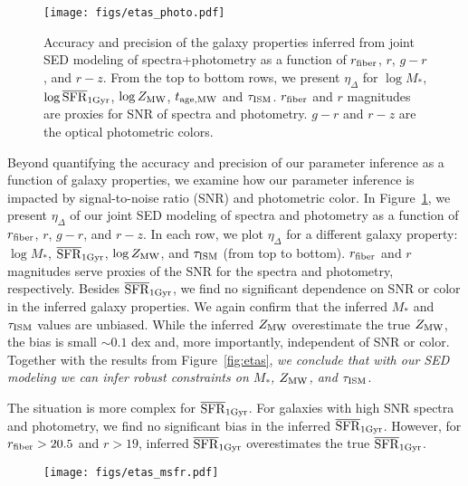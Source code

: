 \begin{figure}
\begin{center}
    \texttt{[image: figs/etas\_photo.pdf]}
    \caption{
        Accuracy and precision of the galaxy properties inferred from joint SED
        modeling of spectra+photometry as a function of $r_{\rm fiber}$, $r$,
        $g-r$, and $r-z$.
        From the top to bottom rows, we present $\eta_\Delta$ for $\log M_*$,
        $\log\overline{\rm SFR}_{\rm 1Gyr}$, $\log Z_{\rm MW}$, $t_{\rm age, MW}$ and $\tau_{\rm ISM}$.
        $r_{\rm fiber}$ and $r$ magnitudes are proxies for SNR of spectra and
        photometry. 
        $g-r$ and $r-z$ are the optical photometric colors. 
    } 
    \label{fig:systematics}
\end{center}
\end{figure}


Beyond quantifying the accuracy and precision of our parameter inference as a
function of galaxy properties, we examine how our parameter inference is
impacted by signal-to-noise ratio (SNR) and photometric color. 
In Figure~\ref{fig:systematics}, we present $\eta_\Delta$ of our joint
SED modeling of spectra and photometry as a function of $r_{\rm fiber}$, $r$,
$g-r$, and $r-z$. 
In each row, we plot $\eta_\Delta$ for a different galaxy property: $\log M_*$,
$\overline{\rm SFR}_{\rm 1Gyr}$, $\log Z_{\rm MW}$, and $\tau_{\rm ISM}$ (from top to bottom).
$r_{\rm fiber}$ and $r$ magnitudes serve proxies of the SNR for the spectra and
photometry, respectively. 
Besides $\overline{\rm SFR}_{\rm 1Gyr}$, we find no significant dependence on SNR or color in the
inferred galaxy properties. 
We again confirm that the inferred $M_*$ and $\tau_{\rm ISM}$ values are
unbiased.
While the inferred $Z_{\rm MW}$ overestimate the true $Z_{\rm MW}$, the bias is
small $\sim 0.1$ dex and, more importantly, independent of SNR or color. 
Together with the results from Figure~\ref{fig:etas}, \emph{we conclude that with our
SED modeling we can infer robust constraints on $M_*$, $Z_{\rm MW}$, and
$\tau_{\rm ISM}$}.

The situation is more complex for $\overline{\rm SFR}_{\rm 1Gyr}$. 
For galaxies with high SNR spectra and photometry, we find no significant bias
in the inferred $\overline{\rm SFR}_{\rm 1Gyr}$. 
However, for $r_{\rm fiber} > 20.5$ and $r > 19$, inferred $\overline{\rm SFR}_{\rm 1Gyr}$
overestimates the true $\overline{\rm SFR}_{\rm 1Gyr}$. 


\begin{figure}
\begin{center}
    \texttt{[image: figs/etas\_msfr.pdf]} \label{fig:etas_msfr}
    \caption{
    }
\end{center}
\end{figure}

